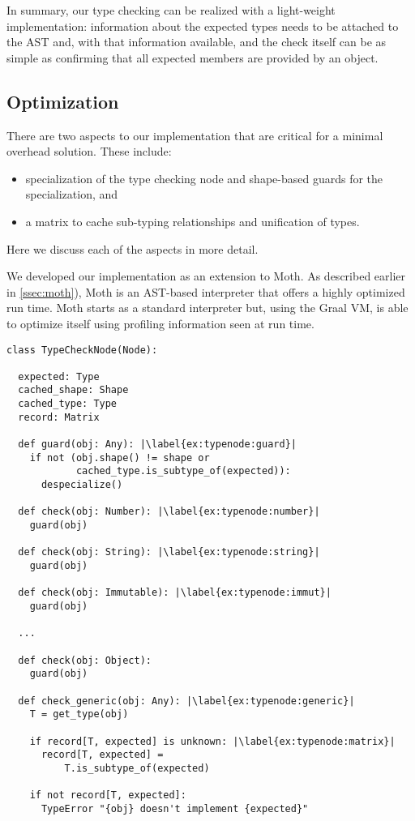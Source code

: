 In summary, our type checking can be realized with a light-weight implementation: 
information about the expected types needs to be attached to the AST and, 
with that information available,
and the check itself can be as simple as confirming that all expected members are provided by an object.


\subsection{Optimization}
\label{ssec:optimization}

There are two aspects to our implementation that are critical for a minimal overhead solution. These include:

\begin{itemize}
  \item specialization of the type checking node and shape-based guards for the specialization, and
  \item a matrix to cache sub-typing relationships and unification of types.
\end{itemize}

Here we discuss each of the aspects in more detail.

We developed our implementation as an extension to Moth.
As described earlier in \cref{ssec:moth}),
Moth is an AST-based interpreter that offers a highly optimized run time.
Moth starts as a standard interpreter but,
using the Graal VM,
is able to optimize itself using profiling information seen at run time. 

\begin{lstlisting}[label={ex:typenode},escapechar=|,caption={An illustration of the type checking node that support type checking},float,floatplacement=htbp]
class TypeCheckNode(Node):

  expected: Type
  cached_shape: Shape
  cached_type: Type
  record: Matrix
  
  def guard(obj: Any): |\label{ex:typenode:guard}|
    if not (obj.shape() != shape or
            cached_type.is_subtype_of(expected)):
      despecialize()

  def check(obj: Number): |\label{ex:typenode:number}|
    guard(obj)

  def check(obj: String): |\label{ex:typenode:string}|
    guard(obj)

  def check(obj: Immutable): |\label{ex:typenode:immut}|
    guard(obj)

  ...

  def check(obj: Object):
    guard(obj)
  
  def check_generic(obj: Any): |\label{ex:typenode:generic}|
    T = get_type(obj)
    
    if record[T, expected] is unknown: |\label{ex:typenode:matrix}|
      record[T, expected] =
          T.is_subtype_of(expected)

    if not record[T, expected]:
      TypeError "{obj} doesn't implement {expected}"
\end{lstlisting}

